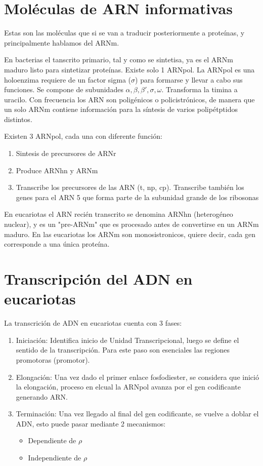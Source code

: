 \section{Moléculas de ARN informativas}

Estas son las moléculas que si se van a traducir posteriormente a proteínas, y principalmente hablamos del ARNm.

En bacterias el tanscrito primario, tal y como se sintetisa, ya es el ARNm maduro listo para sintetizar proteínas. Existe solo 1 ARNpol. La ARNpol es una holoenzima requiere de un factor sigma ($\sigma$) para formarse y llevar a cabo sus funciones. Se compone de subunidades $\alpha , \beta , \beta ' , \sigma , \omega$. Transforma la timina a uracilo. Con frecuencia los ARN son poligénicos o policistrónicos, de manera que un solo ARNm contiene información para la síntesis de varios polipétptidos distintos.

Existen 3 ARNpol, cada una con diferente función:

\begin{enumerate}
    \item Sintesis de precursores de ARNr
    \item Produce ARNhn y ARNm
    \item Transcribe los precursores de las ARN (t, np, cp). Transcribe también los genes para el ARN 5 que forma parte de la subunidad grande de los ribosonas
\end{enumerate}

En eucariotas el ARN recién transcrito se denomina ARNhn (heterogéneo nuclear), y es un "pre-ARNm" que es procesado antes de convertirse en un ARNm maduro. En las eucariotas los ARNm son monosistronicos, quiere decir, cada gen corresponde a una única proteína.
	
\section{Transcripción del ADN en eucariotas}

La transcrición de ADN en eucariotas cuenta con 3 fases:

\begin{enumerate}
    \item Iniciación: Identifica inicio de Unidad Transcripcional, luego se define el sentido de la transcripción. Para este paso son esenciales las regiones promotoras (promotor).
    \item Elongación: Una vez dado el primer enlace fosfodiester, se considera que inició la elongación, proceso en elcual la ARNpol avanza por el gen codificante generando ARN.
    \item Terminación: Una vez llegado al final del gen codificante, se vuelve a doblar el ADN, esto puede pasar mediante 2 mecanismos:
        \begin{itemize}
            \item Dependiente de $\rho$
            \item Independiente de $\rho$
        \end{itemize}
\end{enumerate}

